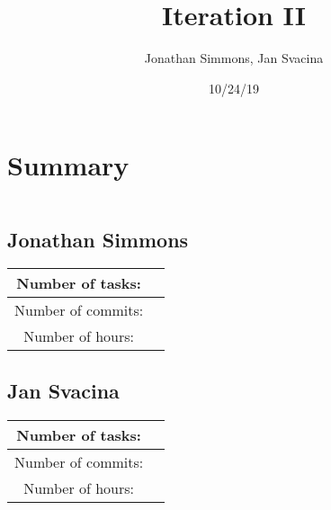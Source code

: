 \documentclass{article}
\title{Iteration II}
\date{10/24/19}
\author{Jonathan Simmons, Jan Svacina}
\begin{document}
    \maketitle



%    


    \section*{Summary}
    \inputminted{python}{snippets/imports.py}

    \subsection*{Jonathan Simmons}

    \begin{center}
        \begin{tabular}{||c c ||}
            \hline
            Number of tasks: &  \\
            \hline
            Number of commits: &  \\
            \hline
            Number of hours: &  \\
            \hline
        \end{tabular}
    \end{center}

    \subsection*{Jan Svacina}

    \begin{center}
        \begin{tabular}{||c c ||}
            \hline
            Number of tasks: &  \\
            \hline
            Number of commits: &  \\
            \hline
            Number of hours: &  \\
            \hline
        \end{tabular}
    \end{center}
\end{document}
